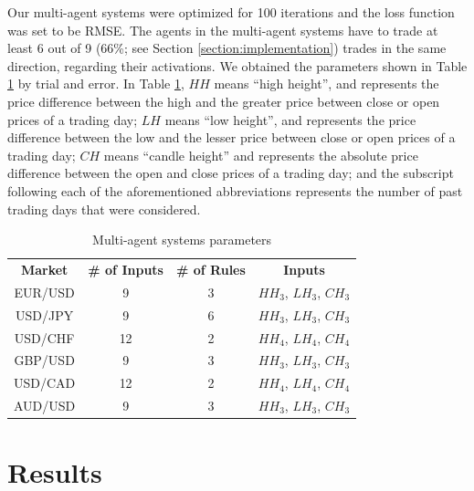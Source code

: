\documentclass{ieeeaccess}
\begin{document}
Our multi-agent systems were optimized for 100 iterations and the loss
function was set to be RMSE. The agents in the multi-agent systems
have to trade at least 6 out of 9 (66\%; see Section
\ref{section:implementation}) trades in the same direction, regarding
their activations. We obtained the parameters shown in Table
\ref{agents-parameters} by trial and error. In Table
\ref{agents-parameters}, $HH$ means ``high height'', and represents
the price difference between the high and the greater price between
close or open prices of a trading day; $LH$ means ``low height'', and
represents the price difference between the low and the lesser price
between close or open prices of a trading day; $CH$ means ``candle
height'' and represents the absolute price difference between the open
and close prices of a trading day; and the subscript following each of
the aforementioned abbreviations represents the number of past trading
days that were considered.


\begin{table}[]
  \caption{Multi-agent systems parameters}
  \small
  \centering
  \begin{tabular}{cccc}
    \textbf{Market} & \textbf{\# of Inputs} & \textbf{\# of Rules} & \textbf{Inputs} \\
    EUR/USD & 9 & 3 & $HH_3$, $LH_3$, $CH_3$ \\
    USD/JPY & 9 & 6 & $HH_3$, $LH_3$, $CH_3$ \\
    USD/CHF & 12 & 2 & $HH_4$, $LH_4$, $CH_4$ \\
    GBP/USD & 9 & 3 & $HH_3$, $LH_3$, $CH_3$ \\
    USD/CAD & 12 & 2 & $HH_4$, $LH_4$, $CH_4$ \\
    AUD/USD & 9 & 3 & $HH_3$, $LH_3$, $CH_3$ \\
  \end{tabular}
  \label{agents-parameters}
\end{table}

\section{Results}
\label{section:results}
\end{document}
